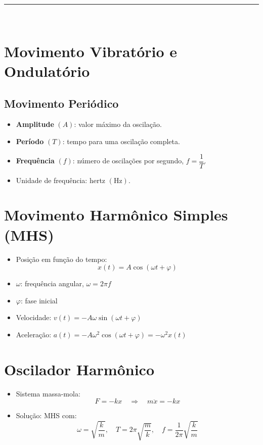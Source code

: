 \documentclass[a4paper,12pt]{article}
\begin{document}
\begin{multicols}{2}
\noindent\rule{\linewidth}{1pt}\\

\section{Movimento Vibratório e Ondulatório}

\subsection{Movimento Periódico}
\begin{itemize}
    \item \textbf{Amplitude} $(A)$: valor máximo da oscilação.
    \item \textbf{Período} $(T)$: tempo para uma oscilação completa.
    \item \textbf{Frequência} $(f)$: número de oscilações por segundo, $f = \dfrac{1}{T}$.
    \item Unidade de frequência: hertz $(\text{Hz})$.
\end{itemize}

\section{Movimento Harmônico Simples (MHS)}

\begin{itemize}
    \item Posição em função do tempo:
    \[
        x(t) = A \cos(\omega t + \varphi)
    \]
    \item $\omega$: frequência angular, $\omega = 2\pi f$
    \item $\varphi$: fase inicial
    \item Velocidade: $v(t) = -A\omega \sin(\omega t + \varphi)$
    \item Aceleração: $a(t) = -A\omega^2 \cos(\omega t + \varphi) = -\omega^2 x(t)$
\end{itemize}

\section{Oscilador Harmônico}
\begin{itemize}
    \item Sistema massa-mola:
    \[
        F = -kx \quad \Rightarrow \quad m\ddot{x} = -kx
    \]
    \item Solução: MHS com:
    \[
        \omega = \sqrt{\frac{k}{m}}, \quad T = 2\pi\sqrt{\frac{m}{k}}, \quad f = \frac{1}{2\pi}\sqrt{\frac{k}{m}}
    \]
\end{itemize}


\end{multicols}
\end{document}
